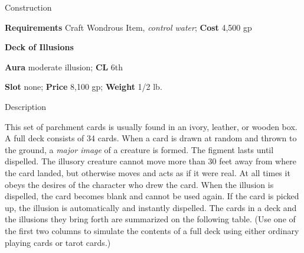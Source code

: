 Construction
				
\textbf{Requirements} Craft Wondrous Item, \textit{control water};\textbf{ Cost }4,500 gp
				
\textbf{Deck of Illusions}
				
\textbf{Aura} moderate illusion;\textbf{ CL }6th
				
\textbf{Slot} none; \textbf{Price} 8,100 gp; \textbf{Weight} 1/2 lb.
				
Description
				
This set of parchment cards is usually found in an ivory, leather, or wooden box. A full deck consists of 34 cards. When a card is drawn at random and thrown to the ground, a \textit{major image }of a creature is formed. The figment lasts until dispelled. The illusory creature cannot move more than 30 feet away from where the card landed, but otherwise moves and acts as if it were real. At all times it obeys the desires of the character who drew the card. When the illusion is dispelled, the card becomes blank and cannot be used again. If the card is picked up, the illusion is automatically and instantly dispelled. The cards in a deck and the illusions they bring forth are summarized on the following table. (Use one of the first two columns to simulate the contents of a full deck using either ordinary playing cards or tarot cards.)

